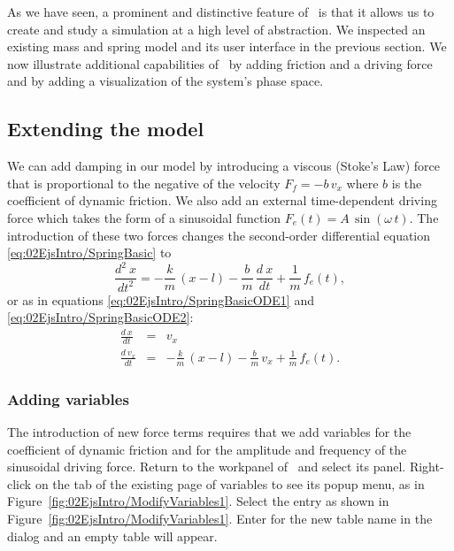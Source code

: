 As we have seen, a prominent and distinctive feature of \Ejs\ is that it allows us to create and study a simulation at a high level of abstraction. We inspected an existing mass and spring model and its user interface in the previous section. We now illustrate additional capabilities of \Ejs\ by adding friction and a driving force and by adding a visualization of the system's phase space.

\subsection{Extending the model}\label{section:02ModifyingModel}

We can add damping in our model by introducing a viscous (Stoke's Law) force that is proportional to the negative of the velocity $F_f = - b\,v_x$ where $b$ is the coefficient of dynamic friction. We also add an external time-dependent driving force which takes the form of a sinusoidal function $F_e(t)=A\,\sin(\omega\, t)$. The introduction of these two forces changes the second-order differential equation \eqref{eq:02EjsIntro/SpringBasic} to
\begin{equation}
  \frac{d^2\ x}{dt^2} = -\frac{k}{m}\,(x-l) - \frac{b}{m}\,\frac{d\ x}{dt} + \frac{1}{m}\,f_e(t), \label{eq:02EjsIntro/SpringComplete}
\end{equation}
or as in equations \eqref{eq:02EjsIntro/SpringBasicODE1} and \eqref{eq:02EjsIntro/SpringBasicODE2}:
\begin{eqnarray}
  \frac{d\ x} {dt} &=& v_x                  \label{eq:02EjsIntro/SpringCompleteODE1} \\
  \frac{d\ v_x}{dt} &=& -\frac{k}{m}\,(x-l) - \frac{b}{m}\,v_x + \frac{1}{m}\,f_e(t). \label{eq:02EjsIntro/SpringCompleteODE2}
\end{eqnarray}

\subsubsection{Adding variables}

The introduction of new force terms requires that we add variables for the coefficient of dynamic friction and for the amplitude and frequency of the sinusoidal driving force.  Return to the  workpanel of \ejs\ and select its  panel. Right-click on the tab of the existing page of variables to see its popup menu, as in Figure~\ref{fig:02EjsIntro/ModifyVariables1}.
Select the  entry as shown in Figure~\ref{fig:02EjsIntro/ModifyVariables1}. Enter  for the new table name in the dialog and an empty table will appear.

